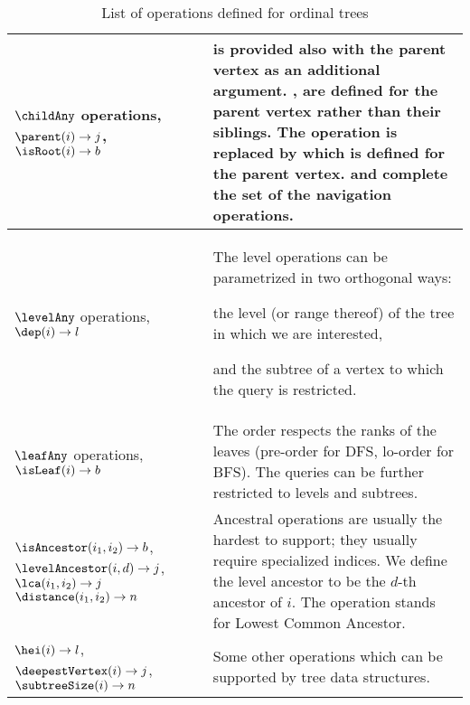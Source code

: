 \begin{table}
\begin{tabularx}{\textwidth}{|L{0.7}|J{1.3}|}
		$\childAny$ operations, \newline
		$\parent(i) \rightarrow j$, \newline
		$\isRoot(i) \rightarrow b$
		& \childSelect{} is provided also with the parent vertex as an additional argument.
		\childFirst{}, \childLast{} are defined for the parent vertex rather than their siblings.
		The operation \childSize{} is replaced by \degree{} which is defined for the parent vertex.
		\parent{} and \isRoot{} complete the set of the navigation operations.\\ \hline
	
		$\levelAny$ operations, \newline
		$\dep(i) \rightarrow l$
		& The level operations can be parametrized in two orthogonal ways:
		\begin{iteminline}
			\item the level (or range thereof) of the tree in which we are interested,
			\item and the subtree of a vertex to which the query is restricted.
		\end{iteminline} \\ \hline
		
		$\leafAny$ operations, \newline
		$\isLeaf(i) \rightarrow b$
		& The order respects the ranks of the leaves (pre-order for DFS, lo-order for BFS).
		The queries can be further restricted to levels and subtrees.\\ \hline \hline
		
		$\isAncestor(i_1, i_2) \rightarrow b$, \newline
		$\levelAncestor(i, d) \rightarrow j$, \newline
		$\lca(i_1, i_2) \rightarrow j$
		$\distance(i_1, i_2) \rightarrow n$
		& Ancestral operations are usually the hardest to support; they usually require specialized indices.
		We define the level ancestor to be the $d$-th ancestor of $i$.
		The operation \lca{} stands for Lowest Common Ancestor. \\ \hline
		
		$\hei(i) \rightarrow l$, \newline
		$\deepestVertex(i) \rightarrow j$, \newline
		$\subtreeSize(i) \rightarrow n$
		& Some other operations which can be supported by tree data structures. \\ \hline
	\end{tabularx}
	\caption{List of operations defined for ordinal trees}
	\label{tab:list-ops}
\end{table}

